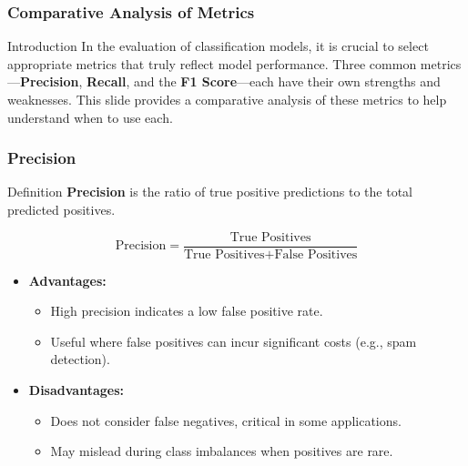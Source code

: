 \documentclass[aspectratio=169]{beamer}
\begin{document}
\begin{frame}[fragile]
    \frametitle{Comparative Analysis of Metrics}
    \begin{block}{Introduction}
        In the evaluation of classification models, it is crucial to select appropriate metrics that truly reflect model performance. 
        Three common metrics—\textbf{Precision}, \textbf{Recall}, and the \textbf{F1 Score}—each have their own strengths and weaknesses. 
        This slide provides a comparative analysis of these metrics to help understand when to use each.
    \end{block}
\end{frame}

\begin{frame}[fragile]
    \frametitle{Precision}
    \begin{block}{Definition}
        \textbf{Precision} is the ratio of true positive predictions to the total predicted positives.
    \end{block}
    \begin{equation}
        \text{Precision} = \frac{\text{True Positives}}{\text{True Positives} + \text{False Positives}} 
    \end{equation}
    \begin{itemize}
        \item \textbf{Advantages:}
            \begin{itemize}
                \item High precision indicates a low false positive rate.
                \item Useful where false positives can incur significant costs (e.g., spam detection).
            \end{itemize}
        \item \textbf{Disadvantages:}
            \begin{itemize}
                \item Does not consider false negatives, critical in some applications.
                \item May mislead during class imbalances when positives are rare.
            \end{itemize}
    \end{itemize}
\end{frame}
\end{document}
